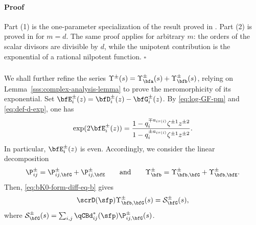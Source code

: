 \documentclass[reqno]{amsart}
\numberwithin{equation}{section}
\newenvironment{pf}{\medskip\paragraph{{\sc Proof}}}{\hfill$\square$\par\medskip}
\begin{document}
\begin{pf}
Part (1) is the one-parameter specialization of the result proved in \cite{appel-gautam-26}.
Part (2) is proved in \cite[Sec.~8.6]{gautam-toledano-17} for $m=d$.
The same proof applies for arbitrary $m$: the orders of the scalar
divisors are divisible by $d$, while the unipotent contribution is the
exponential of a rational nilpotent function.
\end{pf}

\subsubsection{}\label{sss:pf-mero-1}
We shall further refine the series $\Upsilon^\pm(s)=\Upsilon_{\bfa}^\pm(s)+\Upsilon_{\bfb}^\pm(s)$, relying on Lemma~\ref{sss:complex-analysis-lemma} to prove the meromorphicity of its exponential.
Set $\bfE_i^\pm(z)=\bfD_i^\pm(z)-\bfG_i^\pm(z)$.
By \eqref{eq:log-GF-pm} and \eqref{eq:def-d-exp}, one has
\begin{equation}\label{eq:bK0-E-rational}
\exp(2\bfE_i^\pm(z))
=
\frac{1-q_i^{\mp a_{i\tau(i)}}\zeta^{\pm1}z^{\pm2}}
{1-q_i^{\pm a_{i\tau(i)}}\zeta^{\pm1}z^{\pm2}}.
\end{equation}
In particular, $\bfE_i^\pm(z)$ is even. Accordingly, we consider the linear decomposition 
\[
\P_{ij}^\pm
=
\P_{ij,\bfG}^\pm+\P_{ij,\bfE}^\pm
\qquad\text{and}\qquad
\Upsilon_{\bfb}^\pm
=
\Upsilon_{\bfb,\bfG}^\pm+\Upsilon_{\bfb,\bfE}^\pm.
\]
Then, \eqref{eq:bK0-form-diff-eq-b} gives
\begin{equation}\label{eq:bK0-source-G}
\scrD(\sfp)\Upsilon_{\bfb,\bfG}^\pm(s)
=
\mathcal S_{\bfG}^\pm(s),
\end{equation}
where $\mathcal S_{\bfG}^\pm(s)=
\sum_{i,j}\qCBd^*_{ij}(\sfp)\P_{ij,\bfG}^\pm(s)$.\\
\end{document}
